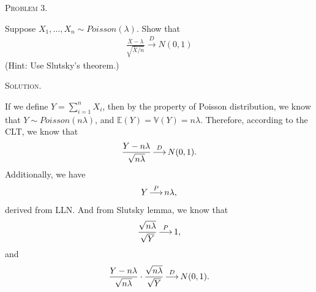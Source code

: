 \documentclass{article}
\begin{document}
\begin{CJK}{UTF8}{gbsn}
    \begin{shaded}
        \noindent\textsc{Problem 3.}\par
        Suppose $X_1,\ldots,X_n\sim Poisson(\lambda)$. Show that
        \begin{align}
            \frac{\bar{X}-\lambda}{\sqrt{\bar{X}/n}} \mathop{\longrightarrow}\limits^DN(0,1)
        \end{align}
        (Hint: Use Slutsky's theorem.)
    \end{shaded}
    \noindent\textsc{Solution.}\par
    If we define $Y=\sum_{i=1}^n X_i$, then by the property of Poisson distribution,
    we know that $Y\sim Poisson(n\lambda)$, and $\mathbb{E}(Y)=\mathbb{V}(Y) = n\lambda$.
    Therefore, according to the CLT, we know that
    \begin{align}
        \frac{Y-n\lambda}{\sqrt{n\lambda}} \mathop{\longrightarrow}\limits^D N(0,1).\notag
    \end{align}
    Additionally, we have
    \begin{align}
        Y\mathop{\longrightarrow}\limits^P n\lambda,\notag
    \end{align}
    derived from LLN. And from Slutsky lemma, we know that
    \begin{align}
        \frac{\sqrt{n\lambda}}{\sqrt{Y}} \mathop{\longrightarrow}\limits^P 1,\notag
    \end{align}
    and
    \begin{align}
        \frac{Y-n\lambda}{\sqrt{n\lambda}} \cdot \frac{\sqrt{n\lambda}}{\sqrt{Y}} \mathop{\longrightarrow}\limits^D N(0, 1).\notag
    \end{align}



\end{CJK}
\end{document}
